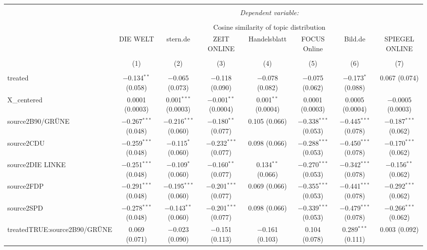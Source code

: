 \documentclass[
]{article}
\begin{document}
\begin{table}[!htbp] \centering 
  \caption{} 
  \label{} 
\tiny 
\begin{tabular}{@{\extracolsep{5pt}}lccccccc} 
\\[-1.8ex]\hline 
\hline \\[-1.8ex] 
 & \multicolumn{7}{c}{\textit{Dependent variable:}} \\ 
\cline{2-8} 
\\[-1.8ex] & \multicolumn{7}{c}{Cosine similarity of topic distribution} \\ 
 & DIE WELT & stern.de & ZEIT ONLINE & Handelsblatt & FOCUS Online & Bild.de & SPIEGEL ONLINE \\ 
\\[-1.8ex] & (1) & (2) & (3) & (4) & (5) & (6) & (7)\\ 
\hline \\[-1.8ex] 
 treated & $-$0.134$^{**}$ (0.058) & $-$0.065 (0.073) & $-$0.118 (0.090) & $-$0.078 (0.082) & $-$0.075 (0.062) & $-$0.173$^{*}$ (0.088) & 0.067 (0.074) \\ 
  X\_centered & 0.0001 (0.0003) & 0.001$^{***}$ (0.0003) & $-$0.001$^{**}$ (0.0004) & 0.001$^{**}$ (0.0004) & 0.0001 (0.0003) & 0.0005 (0.0004) & $-$0.0005 (0.0003) \\ 
  source2B90/GRÜNE & $-$0.267$^{***}$ (0.048) & $-$0.216$^{***}$ (0.060) & $-$0.180$^{**}$ (0.077) & 0.105 (0.066) & $-$0.338$^{***}$ (0.053) & $-$0.445$^{***}$ (0.078) & $-$0.187$^{***}$ (0.062) \\ 
  source2CDU & $-$0.259$^{***}$ (0.048) & $-$0.115$^{*}$ (0.060) & $-$0.232$^{***}$ (0.077) & 0.098 (0.066) & $-$0.288$^{***}$ (0.053) & $-$0.450$^{***}$ (0.078) & $-$0.170$^{***}$ (0.062) \\ 
  source2DIE LINKE & $-$0.251$^{***}$ (0.048) & $-$0.109$^{*}$ (0.060) & $-$0.160$^{**}$ (0.077) & 0.134$^{**}$ (0.066) & $-$0.270$^{***}$ (0.053) & $-$0.342$^{***}$ (0.078) & $-$0.156$^{**}$ (0.062) \\ 
  source2FDP & $-$0.291$^{***}$ (0.048) & $-$0.195$^{***}$ (0.060) & $-$0.201$^{***}$ (0.077) & 0.069 (0.066) & $-$0.355$^{***}$ (0.053) & $-$0.441$^{***}$ (0.078) & $-$0.292$^{***}$ (0.062) \\ 
  source2SPD & $-$0.278$^{***}$ (0.048) & $-$0.143$^{**}$ (0.060) & $-$0.201$^{***}$ (0.077) & 0.098 (0.066) & $-$0.339$^{***}$ (0.053) & $-$0.479$^{***}$ (0.078) & $-$0.266$^{***}$ (0.062) \\ 
  treatedTRUE:source2B90/GRÜNE & 0.069 (0.071) & $-$0.023 (0.090) & $-$0.151 (0.113) & $-$0.161 (0.103) & 0.104 (0.078) & 0.289$^{***}$ (0.111) & 0.003 (0.092) \\ 

\end{tabular}
\end{table}
\end{document}
